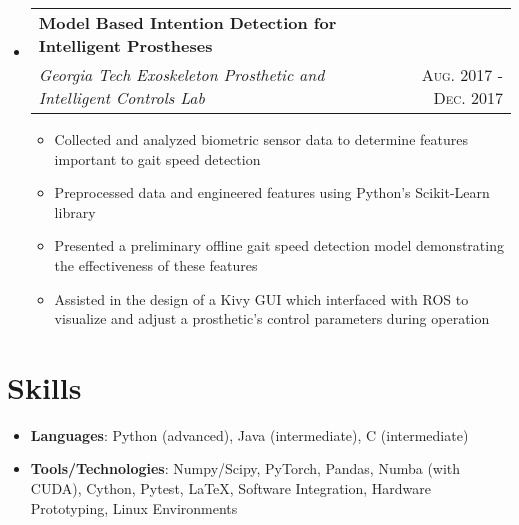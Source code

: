 \documentclass[letterpaper,11pt]{article}
\makeatletter
\newcommand{\resumeItem}[2]{
  \item\small{
    \textbf{#1}{: #2 \vspace{-2pt}}
  }
}
\newcommand{\resumePlainItem}[1]{
  \item\small{#1 \vspace{-2pt}}
}
\newcommand{\resumeSubheading}[4]{
  \vspace{-1pt}\item[]
    \begin{tabular*}{0.97\textwidth}{l@{\extracolsep{\fill}}r}
      \textbf{#1} & #2 \\
      \textit{\small#3} & \textsc{\small #4} \\ %
    \end{tabular*}\vspace{-5pt}
}
\newcommand{\resumeSubHeadingListStart}{\begin{itemize}[leftmargin=*]}
\newcommand{\resumeSubHeadingListEnd}{\end{itemize}}
\newcommand{\resumeItemListStart}{\begin{itemize}}
\newcommand{\resumeItemListEnd}{\end{itemize}\vspace{-5pt}}
\newenvironment{resumeItemList}{\resumeItemListStart}{\resumeItemListEnd}
\newenvironment{resumeSubheadingList}{\resumeSubHeadingListStart}{\resumeSubHeadingListEnd}
\makeatother
\begin{document}
\begin{resumeSubheadingList}
    \resumeSubheading
    {Model Based Intention Detection for Intelligent Prostheses}{}
    {Georgia Tech Exoskeleton Prosthetic and Intelligent Controls Lab}{Aug. 2017 - Dec. 2017}
    \begin{resumeItemList}
      \resumePlainItem{Collected and analyzed biometric sensor data to determine features important to gait
      speed detection}
      \resumePlainItem{Preprocessed data and engineered features using Python's Scikit-Learn library} %
      \resumePlainItem{Presented a preliminary offline gait speed detection model demonstrating the effectiveness of these features}
      \resumePlainItem{Assisted in the design of a Kivy GUI which interfaced with ROS to visualize and adjust a prosthetic's control
      parameters during operation}
    \end{resumeItemList}
  \end{resumeSubheadingList}

\section{Skills}
  \begin{resumeItemList}
    \resumeItem{Languages}{Python (advanced), Java (intermediate), C (intermediate)}
    \resumeItem{Tools/Technologies}{Numpy/Scipy, PyTorch, Pandas, Numba (with CUDA), Cython, Pytest, \LaTeX,
                                    Software Integration, Hardware Prototyping, Linux Environments} %
  \end{resumeItemList}

%


\end{document}
